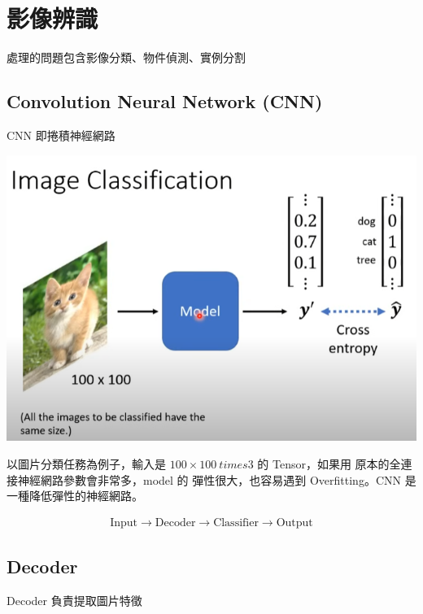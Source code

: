 


\section{影像辨識}
處理的問題包含影像分類、物件偵測、實例分割

\subsection{ Convolution Neural Network (CNN)}

CNN 即捲積神經網路

\includegraphics[width=.8\textwidth]{paste_src/2025-03-20-14-53-32.png}

以圖片分類任務為例子，輸入是 $100 \times 100 \ times 3 $ 的 Tensor，如果用 原本的全連接神經網路參數會非常多，model 的 彈性很大，也容易遇到 Overfitting。CNN 是一種降低彈性的神經網路。

\begin{align*}
  \mbox{Input} \rightarrow \mbox{Decoder} \rightarrow \mbox{Classifier} \rightarrow \mbox{Output}
\end{align*}

\subsection*{Decoder} 
Decoder 負責提取圖片特徵


